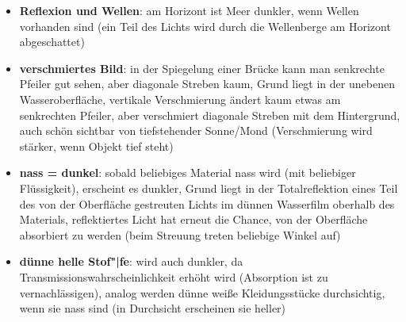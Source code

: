 \linie
\pagebreak
\begin{itemize}
    \item
    \textbf{Reflexion und Wellen}:
    am Horizont ist Meer dunkler, wenn Wellen vorhanden sind
    (ein Teil des Lichts wird durch die Wellenberge am Horizont abgeschattet)
    
    \item
    \textbf{verschmiertes Bild}:
    in der Spiegelung einer Brücke kann man senkrechte Pfeiler gut sehen, aber
    diagonale Streben kaum, Grund liegt in der unebenen Wasseroberfläche,
    vertikale Verschmierung ändert kaum etwas am senkrechten Pfeiler,
    aber verschmiert diagonale Streben mit dem Hintergrund,
    auch schön sichtbar von tiefstehender Sonne/Mond
    (Verschmierung wird stärker, wenn Objekt tief steht)
\end{itemize}
\linie
\begin{itemize}
    \item
    \textbf{nass = dunkel}:
    sobald beliebiges Material nass wird (mit beliebiger Flüssigkeit),
    erscheint es dunkler, Grund liegt in der Totalreflektion eines
    Teil des von der Oberfläche gestreuten Lichts im dünnen Wasserfilm
    oberhalb des Materials, reflektiertes Licht hat erneut die Chance,
    von der Oberfläche absorbiert zu werden
    (beim Streuung treten beliebige Winkel auf)
    
    \item
    \textbf{dünne helle Stof"|fe}:
    wird auch dunkler, da Transmissionswahrscheinlichkeit erhöht wird
    (Absorption ist zu vernachlässigen),
    analog werden dünne weiße Kleidungsstücke durchsichtig, wenn sie nass
    sind (in Durchsicht erscheinen sie heller)
\end{itemize}
\linie

